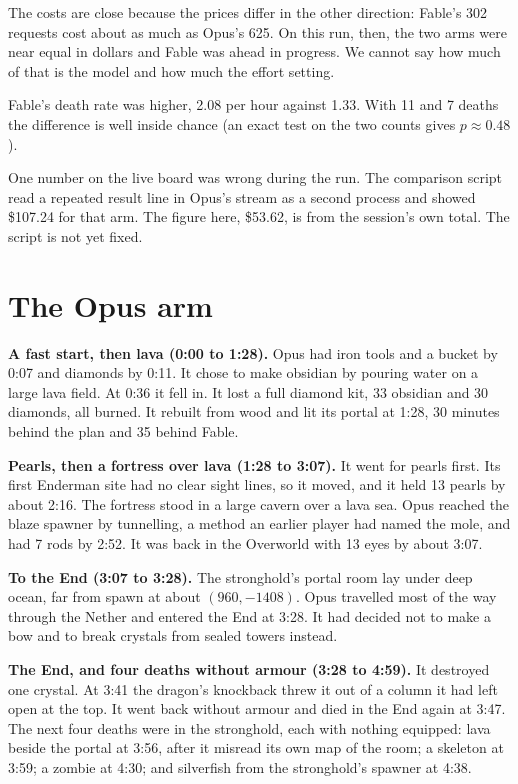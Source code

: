 \documentclass[11pt,a4paper]{article}
\begin{document}
The costs are close because the prices differ in the other direction: Fable's 302 requests cost about as much as Opus's 625. On this run, then, the two arms were near equal in dollars and Fable was ahead in progress. We cannot say how much of that is the model and how much the effort setting.

Fable's death rate was higher, 2.08 per hour against 1.33. With 11 and 7 deaths the difference is well inside chance (an exact test on the two counts gives $p \approx 0.48$).

One number on the live board was wrong during the run. The comparison script read a repeated result line in Opus's stream as a second process and showed \$107.24 for that arm. The figure here, \$53.62, is from the session's own total. The script is not yet fixed.

\section{The Opus arm}
\label{sec:opus}

\textbf{A fast start, then lava (0:00 to 1:28).} Opus had iron tools and a bucket by 0:07 and diamonds by 0:11. It chose to make obsidian by pouring water on a large lava field. At 0:36 it fell in. It lost a full diamond kit, 33 obsidian and 30 diamonds, all burned. It rebuilt from wood and lit its portal at 1:28, 30 minutes behind the plan and 35 behind Fable.

\textbf{Pearls, then a fortress over lava (1:28 to 3:07).} It went for pearls first. Its first Enderman site had no clear sight lines, so it moved, and it held 13 pearls by about 2:16. The fortress stood in a large cavern over a lava sea. Opus reached the blaze spawner by tunnelling, a method an earlier player had named the mole, and had 7 rods by 2:52. It was back in the Overworld with 13 eyes by about 3:07.

\textbf{To the End (3:07 to 3:28).} The stronghold's portal room lay under deep ocean, far from spawn at about $(960, -1408)$. Opus travelled most of the way through the Nether and entered the End at 3:28. It had decided not to make a bow and to break crystals from sealed towers instead.

\textbf{The End, and four deaths without armour (3:28 to 4:59).} It destroyed one crystal. At 3:41 the dragon's knockback threw it out of a column it had left open at the top. It went back without armour and died in the End again at 3:47. The next four deaths were in the stronghold, each with nothing equipped: lava beside the portal at 3:56, after it misread its own map of the room; a skeleton at 3:59; a zombie at 4:30; and silverfish from the stronghold's spawner at 4:38.
\end{document}
